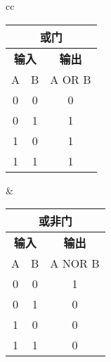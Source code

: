 \begin{tabular}{cc}%
    \begin{tabular}{|c|c|c|}
        \multicolumn{3}{c}{\textbf{或门}} \\
        \hline
        \multicolumn{2}{|c|}{\textbf{输入}} & \textbf{输出} \\
        \hline
        A & B & A OR B \\
        \hline
        \num{0} & \num{0} & \num{0} \\
        \hline
        \num{0} & \num{1} & \num{1} \\
        \hline
        \num{1} & \num{0} & \num{1} \\
        \hline
        \num{1} & \num{1} & \num{1} \\
        \hline
    \end{tabular} &
    \begin{tabular}{|c|c|c|}
        \multicolumn{3}{c}{\textbf{或非门}} \\
        \hline
        \multicolumn{2}{|c|}{\textbf{输入}} & \textbf{输出} \\
        \hline
        A & B & A NOR B \\
        \hline
        \num{0} & \num{0} & \num{1} \\
        \hline
        \num{0} & \num{1} & \num{0} \\
        \hline
        \num{1} & \num{0} & \num{0} \\
        \hline
        \num{1} & \num{1} & \num{0} \\
        \hline
    \end{tabular}  \tabularnewline
\end{tabular}

\bigskip

